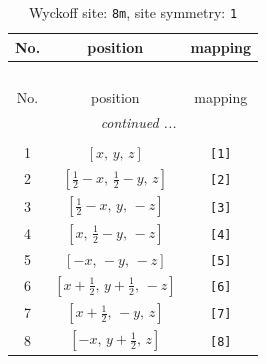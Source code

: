 \documentclass[fleqn,8pt]{jsarticle}
\begin{document}
\renewcommand{\arraystretch}{1.2}
\begin{longtable}{ccc}
\caption{Wyckoff site: {\tt 8m}, site symmetry: {\tt 1}}
 \\
 \hline \hline
No. & position & mapping \\ \hline \endfirsthead

\multicolumn{2}{l}{\tablename\ \thetable{}} \\
 \hline \hline
No. & position & mapping \\ \hline \endhead

 \hline \hline
\multicolumn{2}{r}{\footnotesize\it continued ...} \\ \endfoot

 \hline \hline
\multicolumn{2}{r}{} \\ \endlastfoot

1 & $\left[ x,\, y,\, z \right]$ & {\tt [1]} \\ \hline
2 & $\left[ \frac{1}{2} - x,\, \frac{1}{2} - y,\, z \right]$ & {\tt [2]} \\ \hline
3 & $\left[ \frac{1}{2} - x,\, y,\, - z \right]$ & {\tt [3]} \\ \hline
4 & $\left[ x,\, \frac{1}{2} - y,\, - z \right]$ & {\tt [4]} \\ \hline
5 & $\left[ - x,\, - y,\, - z \right]$ & {\tt [5]} \\ \hline
6 & $\left[ x + \frac{1}{2},\, y + \frac{1}{2},\, - z \right]$ & {\tt [6]} \\ \hline
7 & $\left[ x + \frac{1}{2},\, - y,\, z \right]$ & {\tt [7]} \\ \hline
8 & $\left[ - x,\, y + \frac{1}{2},\, z \right]$ & {\tt [8]} \\
\end{longtable}
\end{document}
